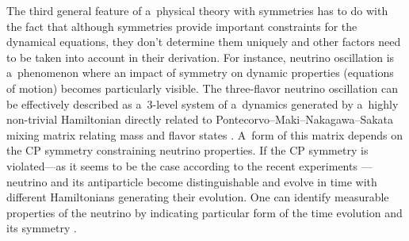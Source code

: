 The third general feature of a~physical theory with symmetries has to do with the fact that although symmetries provide important constraints for the dynamical equations, they don't determine them uniquely and other factors need to be taken into account in their derivation. For instance, neutrino oscillation is a~phenomenon where an impact of symmetry on dynamic properties (equations of motion) becomes particularly visible. The three-flavor neutrino oscillation can be effectively described as a~3-level system of a~dynamics generated by a~highly non-trivial Hamiltonian directly related to Pontecorvo–Maki–Nakagawa–Sakata mixing matrix relating mass and flavor states 
\parencites[e.g][]{banerjee_quantum-information_2015}[][]{bilenky_neutrino_2016}. %
 A~form of this matrix depends on the CP symmetry constraining neutrino properties. If the CP symmetry is violated---as it seems to be the case according to the recent experiments 
\parencite[e.g][]{}%
---neutrino and its antiparticle become distinguishable and evolve in time with different Hamiltonians generating their evolution. One can identify measurable properties of the neutrino by indicating particular form of the time evolution and its symmetry 
\parencite[e.g][]{richter_leggett-garg_2017}.%





